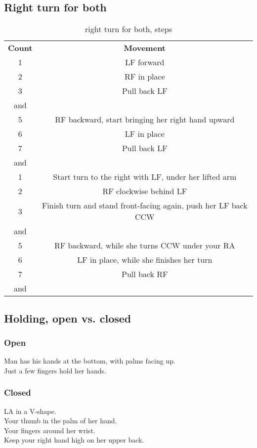 \subsection{Right turn for both}
\begin{table}[H]
\centering
\begin{tabular}{cc}
  \toprule
  \textbf{Count} & \textbf{Movement}\\
  \cmidrule(lr){1-1}\cmidrule(lr){2-2}
  1 & LF forward\\
  2 & RF in place\\
  3 & Pull back LF\\
  and & \\
  5 & RF backward, start bringing her right hand upward\\
  6 & LF in place\\
  7 & Pull back LF\\
  and & \\
  1 & Start turn to the right with LF, under her lifted arm\\
  2 & RF clockwise behind LF\\
  3 & Finish turn and stand front-facing again, push her LF back CCW\\
  and & \\
  5 & RF backward, while she turns CCW under your RA\\
  6 & LF in place, while she finishes her turn\\
  7 & Pull back RF\\
  and & \\
  \bottomrule
\end{tabular}
\label{right_turn_for_both_steps}
\caption{right turn for both, steps}
\end{table}

\subsection{Holding, open vs. closed}
\subsubsection{Open}
Man has his hands at the bottom, with palms facing up.\\
Just a few fingers hold her hands.

\subsubsection{Closed}
LA in a V-shape.\\
Your thumb in the palm of her hand.\\
Your fingers around her wrist.\\
Keep your right hand high on her upper back.


